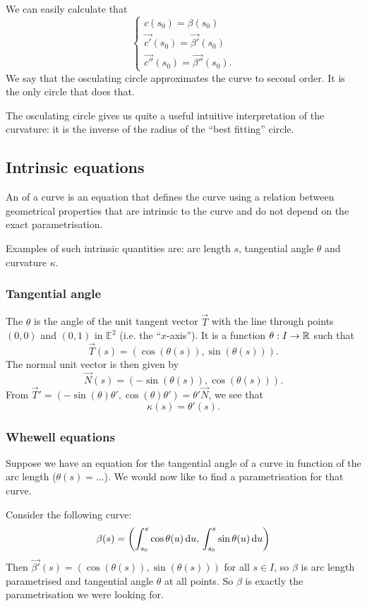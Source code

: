 We can easily calculate that
\[ \begin{cases}
c(s_0) = \beta(s_0) \\
\vec{c'}(s_0) = \vec{\beta'}(s_0) \\
\vec{c''}(s_0) = \vec{\beta''}(s_0).
\end{cases} \]
We say that the osculating circle approximates the curve to second order. It is the only circle that does that.

The osculating circle gives us quite a useful intuitive interpretation of the curvature:
it is the inverse of the radius of the ``best fitting'' circle.

\subsection{Intrinsic equations}
An  of a curve is an equation that defines the curve using a relation between geometrical properties that are intrinsic to the curve and do not depend on the exact parametrisation.

Examples of such intrinsic quantities are: arc length $s$, tangential angle $\theta$ and curvature $\kappa$.
\subsubsection{Tangential angle}
The  $\theta$ is the angle of the unit tangent vector $\vec{T}$ with the line through points $(0,0)$ and $(0,1)$ in $\mathbb{E}^2$ (i.e. the ``$x$-axis''). It is a function $\theta: I \to \mathbb{R}$ such that
\[ \vec{T}(s) = (\cos(\theta(s)), \sin(\theta(s))). \]
The normal unit vector is then given by
\[ \vec{N}(s) = (-\sin(\theta(s)), \cos(\theta(s))). \]
From $\vec{T}' = (-\sin(\theta)\theta', \cos(\theta)\theta') = \theta'\vec{N}$, we see that
\[ \kappa(s) = \theta'(s). \]

\subsubsection{Whewell equations}
Suppose we have an equation for the tangential angle of a curve in function of the arc length ($\theta(s) = \ldots$). We would now like to find a parametrisation for that curve.

Consider the following curve:
\[ \beta(s) = \left(\int_{s_0}^s\cos\theta(u) \operatorname{d \!}{u},\, \int^s_{s_0}\sin\theta(u) \operatorname{d \!}{u}\right) \]
Then $\vec{\beta'}(s) = (\cos(\theta(s)),\sin(\theta(s)))$ for all $s\in I$, so $\beta$ is arc length parametrised and tangential angle $\theta$ at all points. So $\beta$ is exactly the parametrisation we were looking for.

